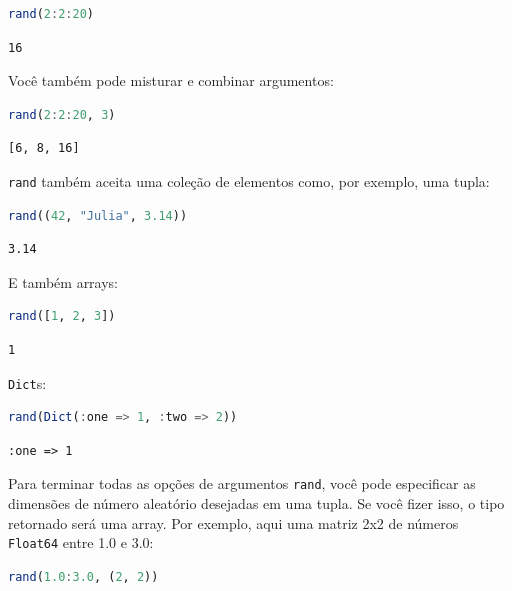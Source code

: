 \documentclass[
  notoc %
]{tufte-book}
\newcommand{\passthrough}[1]{#1}
\begin{document}
\begin{lstlisting}[language=Julia]
rand(2:2:20)
\end{lstlisting}

\begin{lstlisting}[language=Output]
16
\end{lstlisting}

Você também pode misturar e combinar argumentos:

\begin{lstlisting}[language=Julia]
rand(2:2:20, 3)
\end{lstlisting}

\begin{lstlisting}[language=Output]
[6, 8, 16]
\end{lstlisting}

\passthrough{\lstinline!rand!} também aceita uma coleção de elementos
como, por exemplo, uma tupla:

\begin{lstlisting}[language=Julia]
rand((42, "Julia", 3.14))
\end{lstlisting}

\begin{lstlisting}[language=Output]
3.14
\end{lstlisting}

E também arrays:

\begin{lstlisting}[language=Julia]
rand([1, 2, 3])
\end{lstlisting}

\begin{lstlisting}[language=Output]
1
\end{lstlisting}

\passthrough{\lstinline!Dict!}s:

\begin{lstlisting}[language=Julia]
rand(Dict(:one => 1, :two => 2))
\end{lstlisting}

\begin{lstlisting}[language=Output]
:one => 1
\end{lstlisting}

Para terminar todas as opções de argumentos
\passthrough{\lstinline!rand!}, você pode especificar as dimensões de
número aleatório desejadas em uma tupla. Se você fizer isso, o tipo
retornado será uma array. Por exemplo, aqui uma matriz 2x2 de números
\passthrough{\lstinline!Float64!} entre 1.0 e 3.0:

\begin{lstlisting}[language=Julia]
rand(1.0:3.0, (2, 2))
\end{lstlisting}
\end{document}
